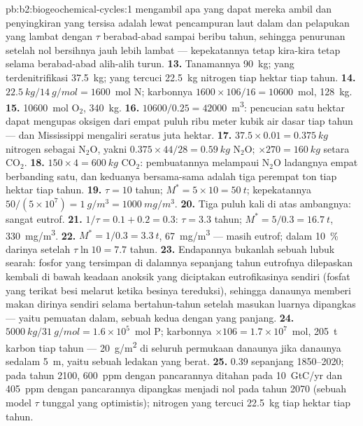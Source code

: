 \begin{solution}{pb:b2:biogeochemical-cycles:1}
mengambil apa yang dapat mereka ambil dan penyingkiran yang tersisa
adalah lewat pencampuran laut dalam dan pelapukan yang lambat dengan
$\tau$ berabad-abad sampai beribu tahun, sehingga penurunan setelah nol
bersihnya jauh lebih lambat --- kepekatannya tetap kira-kira tetap
selama berabad-abad alih-alih turun.
\textbf{13.} Tanamannya \qty{90}{kg}; yang terdenitrifikasi
\qty{37.5}{kg}; yang tercuci \qty{22.5}{kg} nitrogen tiap hektar tiap
tahun.
\textbf{14.} $\qty{22.5}{kg}/\qty{14}{g/mol} = 1600$~mol N; karbonnya
$1600\times 106/16 = \num{10600}$~mol, \qty{128}{kg}.
\textbf{15.} \num{10600}~mol $\mathrm{O_2}$, \qty{340}{kg}.
\textbf{16.} $\num{10600}/0.25 = \num{42000}$~\unit{m^3}: pencucian
satu hektar dapat mengupas oksigen dari empat puluh ribu meter kubik
air dasar tiap tahun --- dan Mississippi mengaliri seratus juta hektar.
\textbf{17.} $37.5\times 0.01 = \qty{0.375}{kg}$ nitrogen sebagai
$\mathrm{N_2O}$, yakni $0.375\times 44/28 = \qty{0.59}{kg}$
$\mathrm{N_2O}$; $\times 270 = \qty{160}{kg}$ setara $\mathrm{CO_2}$.
\textbf{18.} $150\times 4 = \qty{600}{kg}$ $\mathrm{CO_2}$:
pembuatannya melampaui $\mathrm{N_2O}$ ladangnya empat berbanding satu,
dan keduanya bersama-sama adalah tiga perempat ton tiap hektar tiap
tahun.
\textbf{19.} $\tau = 10$ tahun; $M^{*} = 5\times 10 = \qty{50}{t}$;
kepekatannya $50/(5\times 10^{7}) = \qty{1}{g/m^3} =
\qty{1000}{mg/m^3}$.
\textbf{20.} Tiga puluh kali di atas ambangnya: sangat eutrof.
\textbf{21.} $1/\tau = 0.1 + 0.2 = 0.3$: $\tau = 3.3$ tahun; $M^{*} =
5/0.3 = \qty{16.7}{t}$, \qty{330}{mg/m^3}.
\textbf{22.} $M^{*} = 1/0.3 = \qty{3.3}{t}$, \qty{67}{mg/m^3} --- masih
eutrof; dalam \qty{10}{\%} darinya setelah $\tau\ln 10 = 7.7$ tahun.
\textbf{23.} Endapannya bukanlah sebuah lubuk searah: fosfor yang
tersimpan di dalamnya sepanjang tahun eutrofnya dilepaskan kembali di
bawah keadaan anoksik yang diciptakan eutrofikasinya sendiri (fosfat
yang terikat besi melarut ketika besinya tereduksi), sehingga danaunya
memberi makan dirinya sendiri selama bertahun-tahun setelah masukan
luarnya dipangkas --- yaitu pemuatan dalam, sebuah  kedua dengan
 yang panjang.
\textbf{24.} $\qty{5000}{kg}/\qty{31}{g/mol} = 1.6\times 10^{5}$~mol P;
karbonnya $\times 106 = 1.7\times 10^{7}$~mol, \qty{205}{t} karbon tiap
tahun --- \qty{20}{g/m^2} di seluruh permukaan danaunya jika danaunya
sedalam \qty{5}{m}, yaitu sebuah ledakan yang berat.
\textbf{25.}  $0.39$ sepanjang 1850--2020; pada
tahun 2100, \qty{600}{ppm} dengan pancarannya ditahan pada
\qty{10}{GtC/yr} dan \qty{405}{ppm} dengan pancarannya dipangkas
menjadi nol pada tahun 2070 (sebuah model $\tau$ tunggal yang
optimistis); nitrogen yang tercuci \qty{22.5}{kg} tiap hektar tiap
tahun.
\end{solution}
